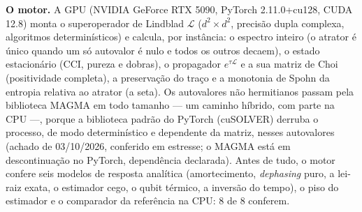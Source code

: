 \documentclass[11pt]{article}
\theoremstyle{definition}\newtheorem{deriv}{Derivação}
\begin{document}
\textbf{O motor.} A GPU (NVIDIA GeForce RTX 5090, PyTorch 2.11.0+cu128, CUDA 12.8) monta o superoperador de Lindblad $\mathcal L$ ($d^2\times d^2$, precisão dupla complexa, algoritmos determinísticos) e calcula, por instância: o espectro inteiro (o atrator é único quando um só autovalor é nulo e todos os outros decaem), o estado estacionário (CCI, pureza e dobras), o propagador $e^{\tau\mathcal L}$ e a sua matriz de Choi (positividade completa), a preservação do traço e a monotonia de Spohn da entropia relativa ao atrator (a seta). Os autovalores não hermitianos passam pela biblioteca MAGMA em todo tamanho --- um caminho híbrido, com parte na CPU ---, porque a biblioteca padrão do PyTorch (cuSOLVER) derruba o processo, de modo determinístico e dependente da matriz, nesses autovalores (achado de 03/10/2026, conferido em estresse; o MAGMA está em descontinuação no PyTorch, dependência declarada). Antes de tudo, o motor confere seis modelos de resposta analítica (amortecimento, \emph{dephasing} puro, a lei-raiz exata, o estimador cego, o qubit térmico, a inversão do tempo), o piso do estimador e o comparador da referência na CPU: 8 de 8 conferem.
\end{document}
